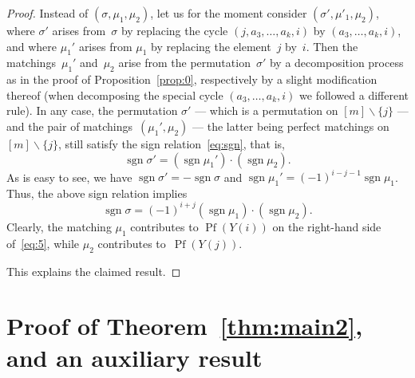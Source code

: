 \documentclass[12pt,reqno]{amsart}
\numberwithin{equation}{section}
\theoremstyle{definition}
\theoremstyle{remark}
\def\sgn{\operatorname{sgn}}
\def\Pf{\operatorname{Pf}}
\def\si{\sigma}
\begin{document}
\begin{proof}
Instead of $(\si,\mu_1,\mu_2)$, let us for the moment consider
$(\si',\mu'_1,\mu_2)$, where $\si'$ arises from~$\si$ by
replacing the cycle $(j,a_3,\dots,a_k,i)$ by $(a_3,\dots,a_k,i)$,
and where $\mu_1'$ arises from $\mu_1$ by replacing the element~$j$
by~$i$. Then the matchings~$\mu_1'$ and~$\mu_2$ arise from the
permutation~$\si'$ by a decomposition process as
in the proof of Proposition~\ref{prop:0}, respectively by
a slight modification
thereof (when decomposing the special cycle $(a_3,\dots,a_k,i)$ we followed
a different rule). In any case, 
the permutation $\si'$ --- which is a permutation on
$[m]\backslash\{j\}$ --- and the pair of matchings~$(\mu_1',\mu_2)$
--- the latter being perfect matchings on $[m]\backslash\{j\}$,
still satisfy the sign relation~\eqref{eq:sgn}, that is,
\begin{equation*} %
\sgn\si'=(\sgn\mu_1')\cdot(\sgn\mu_2).
\end{equation*} 
As is easy to see, we have $\sgn\si'=-\sgn\si$ and
$\sgn\mu_1'=(-1)^{i-j-1}\sgn\mu_1$. Thus, the above sign relation
implies
\begin{equation*} %
\sgn\si=(-1)^{i+j}(\sgn\mu_1)\cdot(\sgn\mu_2).
\end{equation*} 
Clearly, the matching $\mu_1$ contributes to $\Pf(Y(i))$
on the right-hand side
of~\eqref{eq:5}, while $\mu_2$ contributes
to~$\Pf(Y(j))$. 

This explains the claimed result.
\end{proof}

\section{Proof of Theorem~\ref{thm:main2}, and an auxiliary result} 
\label{sec:aux}
\end{document}
